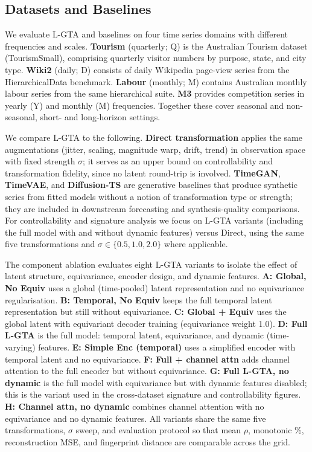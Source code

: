 \subsection{Datasets and Baselines}

We evaluate L-GTA and baselines on four time series domains with different frequencies and scales. \textbf{Tourism} (quarterly; Q) is the Australian Tourism dataset (TourismSmall), comprising quarterly visitor numbers by purpose, state, and city type. \textbf{Wiki2} (daily; D) consists of daily Wikipedia page-view series from the HierarchicalData benchmark. \textbf{Labour} (monthly; M) contains Australian monthly labour series from the same hierarchical suite. \textbf{M3} provides competition series in yearly (Y) and monthly (M) frequencies. Together these cover seasonal and non-seasonal, short- and long-horizon settings.

We compare L-GTA to the following. \textbf{Direct transformation} applies the same augmentations (jitter, scaling, magnitude warp, drift, trend) in observation space with fixed strength $\sigma$; it serves as an upper bound on controllability and transformation fidelity, since no latent round-trip is involved. \textbf{TimeGAN}, \textbf{TimeVAE}, and \textbf{Diffusion-TS} are generative baselines that produce synthetic series from fitted models without a notion of transformation type or strength; they are included in downstream forecasting and synthesis-quality comparisons. For controllability and signature analysis we focus on L-GTA variants (including the full model with and without dynamic features) versus Direct, using the same five transformations and $\sigma \in \{0.5, 1.0, 2.0\}$ where applicable.

The component ablation evaluates eight L-GTA variants to isolate the effect of latent structure, equivariance, encoder design, and dynamic features. \textbf{A: Global, No Equiv} uses a global (time-pooled) latent representation and no equivariance regularisation. \textbf{B: Temporal, No Equiv} keeps the full temporal latent representation but still without equivariance. \textbf{C: Global + Equiv} uses the global latent with equivariant decoder training (equivariance weight 1.0). \textbf{D: Full L-GTA} is the full model: temporal latent, equivariance, and dynamic (time-varying) features. \textbf{E: Simple Enc (temporal)} uses a simplified encoder with temporal latent and no equivariance. \textbf{F: Full + channel attn} adds channel attention to the full encoder but without equivariance. \textbf{G: Full L-GTA, no dynamic} is the full model with equivariance but with dynamic features disabled; this is the variant used in the cross-dataset signature and controllability figures. \textbf{H: Channel attn, no dynamic} combines channel attention with no equivariance and no dynamic features. All variants share the same five transformations, $\sigma$ sweep, and evaluation protocol so that mean $\rho$, monotonic \%, reconstruction MSE, and fingerprint distance are comparable across the grid.

